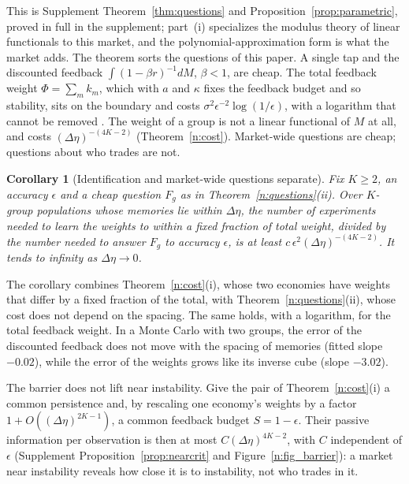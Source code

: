 \documentclass[12pt]{article}
\newtheorem{corollary}[theorem]{Corollary}
\theoremstyle{definition}
\theoremstyle{remark}
\begin{document}
This is Supplement Theorem~\ref{thm:questions} and Proposition~\ref{prop:parametric}, proved in full in the supplement; part~(i) specializes the modulus theory of linear functionals \citep{donoho1994} to this market, and the polynomial-approximation form is what the market adds. The theorem sorts the questions of this paper. A single tap and the discounted feedback $\int(1-\beta r)^{-1}dM$, $\beta<1$, are cheap. The total feedback weight $\Phi=\sum_mk_m$, which with $a$ and $\kappa$ fixes the feedback budget and so stability, sits on the boundary and costs $\sigma^2\epsilon^{-2}\log(1/\epsilon)$, with a logarithm that cannot be removed \citep{niroula2026b}. The weight of a group is not a linear functional of $M$ at all, and costs $(\Delta\eta)^{-(4K-2)}$ (Theorem~\ref{n:cost}). Market-wide questions are cheap; questions about who trades are not.

\begin{corollary}[Identification and market-wide questions separate]\label{n:sep}
Fix $K\ge2$, an accuracy $\epsilon$ and a cheap question $F_g$ as in Theorem~\ref{n:questions}(ii). Over $K$-group populations whose memories lie within $\Delta\eta$, the number of experiments needed to learn the weights to within a fixed fraction of total weight, divided by the number needed to answer $F_g$ to accuracy $\epsilon$, is at least $c\,\epsilon^2(\Delta\eta)^{-(4K-2)}$. It tends to infinity as $\Delta\eta\to0$.
\end{corollary}

The corollary combines Theorem~\ref{n:cost}(i), whose two economies have weights that differ by a fixed fraction of the total, with Theorem~\ref{n:questions}(ii), whose cost does not depend on the spacing. The same holds, with a logarithm, for the total feedback weight. In a Monte Carlo with two groups, the error of the discounted feedback does not move with the spacing of memories (fitted slope $-0.02$), while the error of the weights grows like its inverse cube (slope $-3.02$).

The barrier does not lift near instability. Give the pair of Theorem~\ref{n:cost}(i) a common persistence and, by rescaling one economy's weights by a factor $1+O((\Delta\eta)^{2K-1})$, a common feedback budget $S=1-\epsilon$. Their passive information per observation is then at most $C(\Delta\eta)^{4K-2}$, with $C$ independent of $\epsilon$ (Supplement Proposition~\ref{prop:nearcrit} and Figure~\ref{n:fig_barrier}): a market near instability reveals how close it is to instability, not who trades in it.
\end{document}

